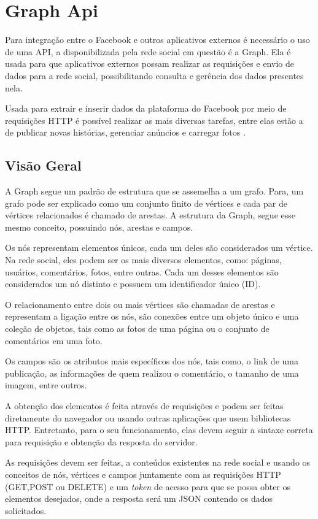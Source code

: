 \chapter[Graph Api]{Graph Api}
Para integração entre o Facebook e outros aplicativos externos é necessário o uso de uma API, a disponibilizada pela rede social em questão é a Graph. Ela é usada para que aplicativos externos possam realizar as requisições e envio de dados para a rede social, possibilitando consulta e gerência dos dados presentes nela. 

Usada para extrair e inserir dados da plataforma do Facebook por meio de requisições HTTP é possível realizar as mais diversas tarefas, entre elas estão a de publicar novas histórias, gerenciar anúncios e carregar fotos \cite{facebook2018b}.

\section{Visão Geral}
A Graph segue um padrão de estrutura que se assemelha a um grafo. Para\cite{soares2014}, um grafo pode ser explicado como um conjunto finito de vértices e cada par de vértices relacionados é chamado de arestas. A estrutura da Graph, segue esse mesmo conceito, possuindo nós, arestas e campos. 

Os nós representam elementos únicos, cada um deles são considerados um vértice. Na rede social, eles podem ser os mais diversos elementos, como: páginas, usuários, comentários, fotos, entre outras. Cada um desses elementos são considerados um nó distinto \cite{facebook2018b} e possuem um identificador único (ID). 

O relacionamento entre dois ou mais vértices são chamadas de arestas e representam a ligação entre os nós, são conexões entre um objeto único e uma coleção de objetos, tais como as fotos de uma página ou o conjunto de comentários em uma foto. 

Os campos são os atributos mais específicos dos nós, tais como, o link de uma publicação, as informações de quem realizou o comentário, o tamanho de uma imagem, entre outros.

A obtenção dos elementos é feita através de requisições e podem ser feitas diretamente do navegador ou usando outras aplicações que usem bibliotecas HTTP. Entretanto, para o seu funcionamento, elas devem seguir a sintaxe correta para requisição e obtenção da resposta do servidor. 

As requisições devem ser feitas, a conteúdos existentes na rede social e usando os conceitos de nós, vértices e campos juntamente com as requisições HTTP (GET,POST ou DELETE) e um \textit{token} de acesso para que se possa obter os elementos desejados, onde a resposta será um JSON contendo os dados solicitados.

